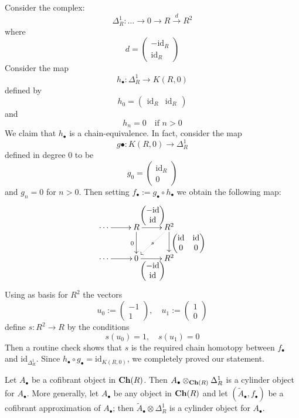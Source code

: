 \begin{refsection}
\begin{eg} \label{eg delta^1 for chain complexes}
Consider the complex:
\[
\Delta^1_R \colon \ldots \to 0 \to R \xrightarrow{d} R^2
\]
where
\[
d = \begin{pmatrix} - \mathrm{id}_R \\ \mathrm{id}_R \end{pmatrix}
\]
Consider the map
\[
h_\bullet \colon \Delta^1_R \to K(R,0)
\]
defined by
\[
h_0 = \begin{pmatrix} \mathrm{id}_R & \mathrm{id}_R \end{pmatrix}
\]
and
\[
h_n = 0 \quad \text{if } n > 0
\]
We claim that $h_\bullet$ is a chain-equivalence. In fact, consider the map
\[
g \bullet \colon K(R,0) \to \Delta^1_R
\]
defined in degree $0$ to be
\[
g_0 = \begin{pmatrix} \mathrm{id}_R \\ 0 \end{pmatrix}
\]
and $g_n = 0$ for $n > 0$. Then setting $f_\bullet := g_\bullet \circ h_\bullet$ we obtain the following map:
\[
\xymatrix{
\cdots \ar[r] & R \ar[d]_0 \ar[r]^{\scriptstyle \begin{pmatrix} - \mathrm{id} \\ \mathrm{id} \end{pmatrix}} & R^2 \ar[d]^{\scriptstyle \begin{pmatrix} \mathrm{id} & \mathrm{id} \\ 0 & 0 \end{pmatrix}} \ar@{.>}[dl]|-s \\ \cdots \ar[r] & 0 \ar[r]_{\scriptstyle \begin{pmatrix} - \mathrm{id} \\ \mathrm{id} \end{pmatrix}} & R^2
}
\]
Using as basis for $R^2$ the vectors
\[
u_0 := \begin{pmatrix}
-1 \\ 1
\end{pmatrix}, \quad u_1 := \begin{pmatrix} 1 \\ 0 \end{pmatrix}
\]
define $s \colon R^2 \to R$ by the conditions
\[
s(u_0) = 1, \quad s(u_1) = 0
\]
Then a routine check shows that $s$ is the required chain homotopy between $f_\bullet$ and $\mathrm{id}_{\Delta^1_R}$. Since $h_\bullet \circ g_\bullet = \mathrm{id}_{K(R,0)}$, we completely proved our statement.
\end{eg}


\begin{lemma}
Let $A_\bullet$ be a cofibrant object in $\mathbf{Ch}(R)$. Then $A_\bullet \otimes_{\mathbf{Ch}(R)} \Delta^1_R$ is a cylinder object for $A_\bullet$. More generally, let $A_\bullet$ be any object in $\mathbf{Ch}(R)$ and let $(\widetilde{A}_\bullet,f_\bullet)$ be a cofibrant approximation of $A_\bullet$; then $\widetilde{A}_\bullet \otimes \Delta^1_R$ is a cylinder object for $A_\bullet$.
\end{lemma}


\end{refsection}
